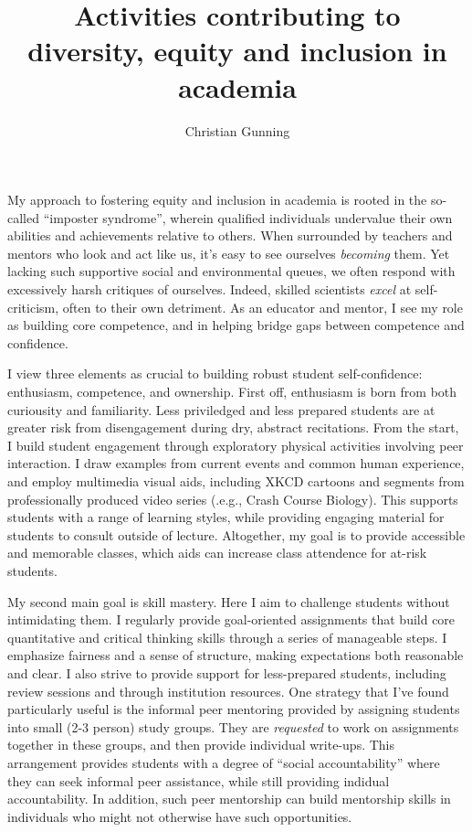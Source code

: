 \documentclass[12pt]{article}
\author{Christian Gunning}
\title{Activities contributing to\\diversity, equity and inclusion in academia}
\date{}
\begin{document}
\maketitle
\thispagestyle{empty}
\linespread{1.25}\selectfont

My approach to fostering equity and inclusion in academia 
is rooted in the so-called ``imposter syndrome'', wherein 
qualified individuals undervalue their own abilities and 
achievements relative to others.  When surrounded by 
teachers and mentors who look and act like us, it's easy to 
see ourselves {\em becoming} them.  Yet lacking such supportive 
social and environmental queues, we often respond with excessively
harsh critiques of ourselves. Indeed, skilled scientists
{\em excel} at self-criticism, often to their own detriment.
As an educator and mentor, I see my role as building 
core competence, and in helping
bridge gaps between competence and confidence.

I view three elements as crucial to building robust student 
self-confidence: enthusiasm, 
competence, and ownership.  First off, enthusiasm is born from both 
curiousity and familiarity. Less priviledged and less prepared
students are at greater risk from disengagement during dry, abstract
recitations. From the start, I build student engagement 
through exploratory physical activities involving peer interaction.
I draw examples from current events and common 
human experience, and employ multimedia visual aids, including 
XKCD cartoons and segments from professionally produced
video series (.e.g., Crash Course Biology). 
This supports students with a range of learning styles, while
providing engaging material for students to consult outside 
of lecture. Altogether, my goal is to provide accessible and 
memorable classes, which aids can increase class attendence for 
at-risk students.

My second main goal is skill mastery. 
Here I aim to challenge students without intimidating
them. I regularly provide goal-oriented assignments 
that build core quantitative and critical thinking skills 
through a series of manageable steps. I emphasize
fairness and a sense of structure, making expectations 
both reasonable and clear. I also strive to provide
support for less-prepared students, including review
sessions and through institution resources. One 
strategy that I've found particularly 
useful is the informal peer mentoring provided by 
assigning students into small (2-3 person)
study groups. They are {\em requested} to work on
assignments together in these groups, and then provide
individual write-ups. This arrangement provides 
students with a degree of ``social accountability'' where
they can seek informal peer assistance, while still 
providing indidual accountability. In addition, such peer 
mentorship can build mentorship skills in individuals who
might not otherwise have such opportunities.
\end{document}
